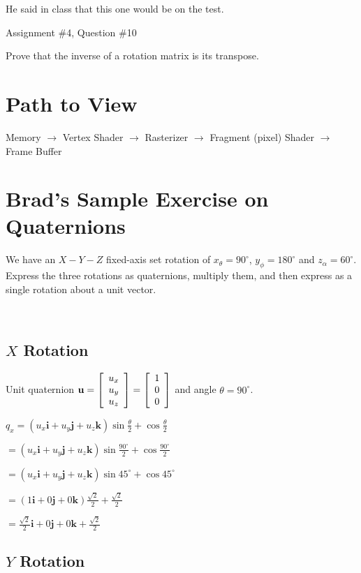 \documentclass[11pt]{article}
\begin{document}
\begin{spacing}{1.2}
He said in class that this one would be on the test.  

Assignment \#4, Question \#10

Prove that the inverse of a rotation matrix is its transpose.  

\section{Path to View}

Memory $\to$ Vertex Shader $\to$ Rasterizer $\to$ Fragment (pixel) Shader $\to$ Frame Buffer

\section{Brad's Sample Exercise on Quaternions}

We have an $X-Y-Z$ fixed-axis set rotation of $x_{\theta} = 90^{\circ}$, $y_{\phi} = 180^{\circ}$ and $z_{\alpha} = 60^{\circ}$.  Express the three rotations as quaternions, multiply them, and then express as a single rotation about a unit vector.

\

\subsection{$X$ Rotation}

Unit quaternion 
$\displaystyle 
\mathbf{u} = 
\left[
	\begin{array}{c}
		u_x \cr u_y \cr u_z \cr
	\end{array}
\right]
= 
\left[
	\begin{array}{c}
		1 \cr 0 \cr 0 \cr
	\end{array}
\right]
$
and angle $\theta = 90^{\circ}$.

$q_x
 = (u_x \mathbf{i} + u_y \mathbf{j} + u_z \mathbf{k}) \sin \frac{\theta}{2} + \cos \frac{\theta}{2}
 $
 
 $ = (u_x \mathbf{i} + u_y \mathbf{j} + u_z \mathbf{k}) \sin \frac{90^{\circ}}{2} + \cos \frac{90^{\circ}}{2}$

 $ = (u_x \mathbf{i} + u_y \mathbf{j} + u_z \mathbf{k}) \sin 45^{\circ} + \cos 45^{\circ}$

 $ = (1 \mathbf{i} + 0\mathbf{j} + 0\mathbf{k}) \frac{\sqrt2}{2} + \frac{\sqrt2}{2}$

 $ =  \frac{\sqrt2}{2}\mathbf{i} + 0\mathbf{j} + 0\mathbf{k}  + \frac{\sqrt2}{2}$

    
\subsection{$Y$ Rotation}


\end{spacing}
\end{document}
